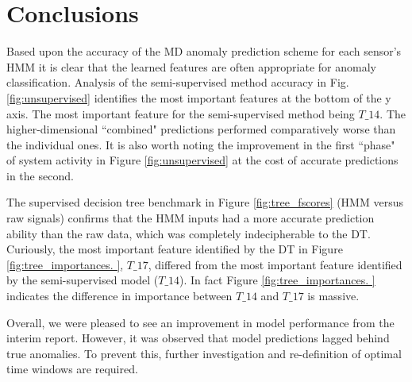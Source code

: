 \documentclass[twocolumn,10pt]{article}
\begin{document}
\section{Conclusions}


Based upon the accuracy of the MD anomaly prediction scheme for each sensor's HMM it is clear that the learned features are often appropriate for anomaly classification. Analysis of the semi-supervised method accuracy in Fig. \ref{fig:unsupervised} identifies the most important features at the bottom of the y axis. The most important feature for the semi-supervised method being $T\_14$. The higher-dimensional ``combined" predictions performed comparatively worse than the individual ones. It is also worth noting the improvement in the first ``phase" of system activity in Figure \ref{fig:unsupervised} at the cost of accurate predictions in the second.

The supervised decision tree benchmark in Figure \ref{fig:tree_fscores} (HMM versus raw signals) confirms that the HMM inputs had a more accurate prediction ability than the raw data, which was completely indecipherable to the DT. Curiously, the most important feature identified by the DT in Figure \ref{fig:tree_importances. }, $T\_17$, differed from the most important feature identified by the semi-supervised model ($T\_14$). In fact Figure \ref{fig:tree_importances. } indicates the difference in importance between $T\_14$ and $T\_17$ is massive. 

Overall, we were pleased to see an improvement in model performance from the interim report. However, it was observed that model predictions lagged behind true anomalies. To prevent this, further investigation and re-definition of optimal time windows are required.



\end{document}
